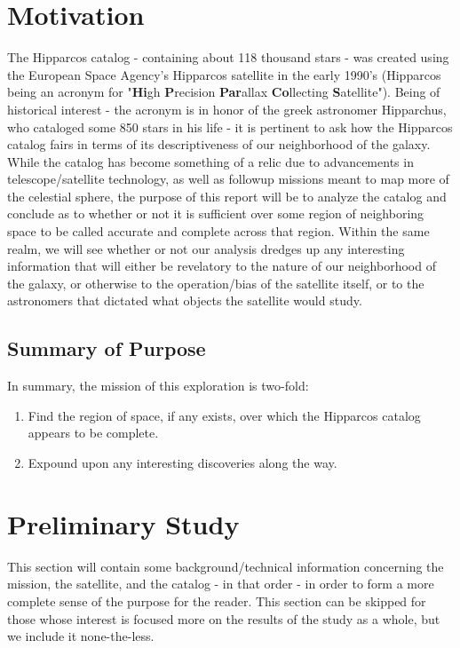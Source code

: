 \documentclass{business-covered} %
\subtitle{An Analysis of the completeness of the Hipparcos Catalog}
\begin{document}
	
	\section{Motivation}
		The Hipparcos catalog - containing about 118 thousand stars - was created using the European Space Agency's Hipparcos satellite in the early 1990's (Hipparcos being an acronym for "\textbf{Hi}gh \textbf{P}recision \textbf{Par}allax \textbf{Co}llecting \textbf{S}atellite"). Being of historical interest - the acronym is in honor of the greek astronomer Hipparchus, who cataloged some 850 stars in his life - it is pertinent to ask how the Hipparcos catalog fairs in terms of its descriptiveness of our neighborhood of the galaxy. While the catalog has become something of a relic due to advancements in telescope/satellite technology, as well as followup missions meant to map more of the celestial sphere, the purpose of this report will be to analyze the catalog and conclude as to whether or not it is sufficient over some region of neighboring space to be called  accurate and complete across that region. Within the same realm, we will see whether or not our analysis dredges up any interesting information that will either be revelatory to the nature of our neighborhood of the galaxy, or otherwise to the operation/bias of the satellite itself, or to the astronomers that dictated what objects the satellite would study.
		\subsection{Summary of Purpose}
		In summary, the mission of this exploration is two-fold:
		
		\begin{enumerate}
			\item Find the region of space, if any exists, over which the Hipparcos catalog appears to be complete.
			\item Expound upon any interesting discoveries along the way.
		\end{enumerate}

\pagebreak
	\section{Preliminary Study}
		This section will contain some background/technical information concerning the mission, the satellite, and the catalog - in that order - in order to form a more complete sense of the purpose for the reader. This section can be skipped for those whose interest is focused more on the results of the study as a whole, but we include it none-the-less.
\end{document}
